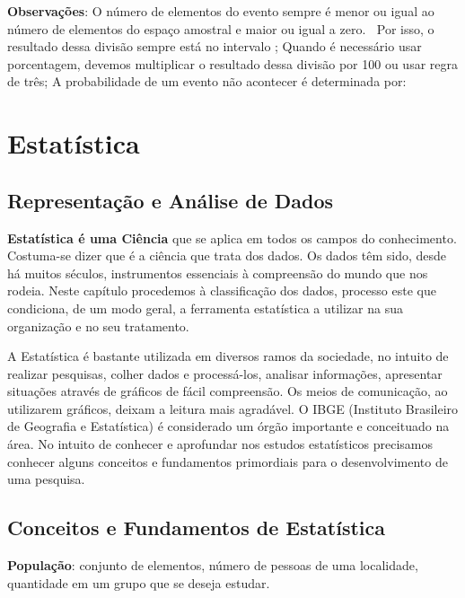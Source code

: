\begin{multicols*}{2}

	\textbf{Observações}:  O número de elementos do evento sempre é menor ou igual ao número de elementos do espaço amostral e maior ou igual a zero. $ \ $ Por isso, o resultado dessa divisão sempre está no intervalo ; Quando é necessário usar porcentagem, devemos multiplicar o resultado dessa divisão por 100 ou usar regra de três;
	A probabilidade de um evento não acontecer é determinada por:







	\section{Estatística}

	\subsection{Representação e Análise de Dados}
	\textbf{ Estatística é uma Ciência} que se aplica em todos os campos do conhecimento. Costuma-se dizer que é a ciência que trata dos dados. Os dados têm sido, desde há muitos séculos, instrumentos essenciais à compreensão do mundo que nos rodeia. Neste capítulo procedemos à classificação dos dados, processo este que condiciona, de um modo geral, a ferramenta estatística a utilizar na sua organização e no seu tratamento.

	A Estatística é bastante utilizada em diversos ramos da sociedade, no intuito de realizar pesquisas, colher dados e processá-los, analisar informações, apresentar situações através de gráficos de fácil compreensão. Os meios de comunicação, ao utilizarem gráficos, deixam a leitura mais agradável. O IBGE (Instituto Brasileiro de Geografia e Estatística) é considerado um órgão importante e conceituado na área. No intuito de conhecer e aprofundar nos estudos estatísticos precisamos conhecer alguns conceitos e fundamentos primordiais para o desenvolvimento de uma pesquisa.

	\subsection{Conceitos e Fundamentos de Estatística}

	\textbf{População}: conjunto de elementos, número de pessoas de uma localidade, quantidade em um grupo que se deseja estudar.


\end{multicols*}
